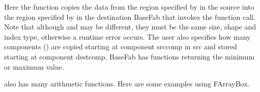 \documentclass[letterpaper,10pt,english]{sphinxmanual}
\begin{document}
\sphinxAtStartPar
Here the function copies the data from the region specified by  in
the source  into the region specified by  in
the destination BaseFab that invokes the function call. Note that although
 and  may be different, they must be the same size,
shape and index type, otherwise a runtime error occurs. The user also specifies
how many components () are copied starting at component
srccomp in src and stored starting at component destcomp. BaseFab has functions
returning the minimum or maximum value.

\begin{sphinxVerbatim}[commandchars=\\\{\}]
      
        
      
        
\end{sphinxVerbatim}

\sphinxAtStartPar
{} also has many arithmetic functions. Here are some examples using
FArrayBox.
\end{document}
